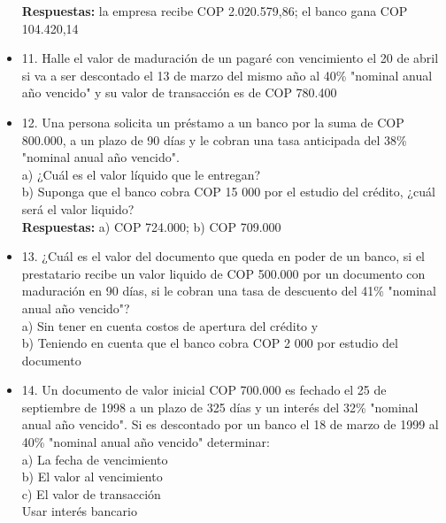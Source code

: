 \begin{itemize}
       \textbf{Respuestas:} la empresa recibe COP 2.020.579,86; el banco gana COP 104.420,14
       \medskip

 \item 11. Halle el valor de maduración de un pagaré con vencimiento el 20 de abril si va a ser descontado el 13 de marzo del mismo año al 40\% "nominal anual año vencido" y su valor de transacción es de  COP  780.400\\
       \medskip

 \item 12. Una persona solicita un préstamo a un banco por la suma de COP 800.000, a un plazo de 90 días y le cobran una tasa anticipada del 38\% "nominal anual año vencido".\\

       a) ¿Cuál es el valor líquido que le entregan?\\
       b) Suponga que el banco cobra COP 15 000 por el estudio del crédito, ¿cuál será el valor liquido?\\

       \textbf{Respuestas:} a) COP 724.000; b) COP 709.000
       \medskip

 \item 13. ¿Cuál es el valor del documento que queda en poder de un banco, si el prestatario recibe un valor liquido de  COP 500.000 por un documento con maduración en 90 días, si le cobran una tasa de descuento del 41\% "nominal anual año vencido"? \\

       a) Sin tener en cuenta costos de apertura del crédito y\\
       b) Teniendo en cuenta que el banco cobra COP 2 000 por estudio del documento \\
       \medskip

 \item 14. Un documento de valor inicial COP 700.000 es fechado el 25 de septiembre de 1998 a un plazo de 325 días y un interés del 32\% "nominal anual año vencido". Si es descontado por un banco el 18 de marzo de 1999 al 40\% "nominal anual año vencido" determinar:\\

       a) La fecha de vencimiento\\
       b) El valor al vencimiento\\
       c) El valor de transacción \\
       Usar interés bancario\\

       \medskip


\end{itemize}

